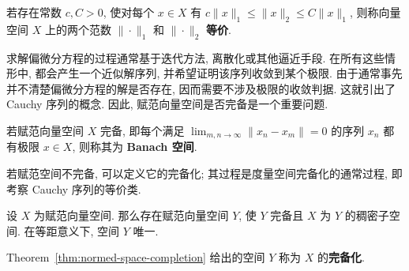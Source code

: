 \begin{Definition}
\label{def:equivalent-norms}
若存在常数 $c,C>0$, 使对每个 $x\in X$ 有 $c\|x\|_1\leq\|x\|_2\leq C\|x\|_1$, 则称向量空间 $X$ 上的两个范数 $\|\cdot\|_1$ 和 $\|\cdot\|_2$ \textbf{等价}.
\end{Definition}

求解偏微分方程的过程通常基于迭代方法, 离散化或其他逼近手段. 在所有这些情形中, 都会产生一个近似解序列, 并希望证明该序列收敛到某个极限. 由于通常事先并不清楚偏微分方程的解是否存在, 因而需要不涉及极限的收敛判据. 这就引出了 Cauchy 序列的概念. 因此, 赋范向量空间是否完备是一个重要问题.

\begin{Definition}
\label{def:banach-space}
若赋范向量空间 $X$ 完备, 即每个满足 $\lim_{m,n\to\infty}\|x_n-x_m\|=0$ 的序列 $x_n$ 都有极限 $x\in X$, 则称其为 \textbf{Banach 空间}.
\end{Definition}

若赋范空间不完备, 可以定义它的完备化; 其过程是度量空间完备化的通常过程, 即考察 Cauchy 序列的等价类.

\begin{Theorem}
\label{thm:normed-space-completion}
设 $X$ 为赋范向量空间. 那么存在赋范向量空间 $Y$, 使 $Y$ 完备且 $X$ 为 $Y$ 的稠密子空间. 在等距意义下, 空间 $Y$ 唯一.
\end{Theorem}

\begin{Definition}
\label{def:normed-space-completion}
Theorem~\ref{thm:normed-space-completion} 给出的空间 $Y$ 称为 $X$ 的\textbf{完备化}.
\end{Definition}

